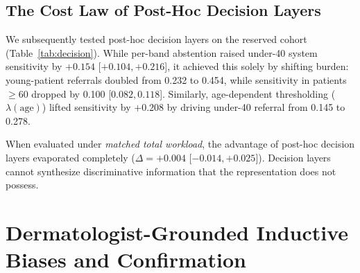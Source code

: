 \documentclass[journal]{IEEEtran}
\newcommand{\uforty}{under-40}
\begin{document}
\subsection{The Cost Law of Post-Hoc Decision Layers}
We subsequently tested post-hoc decision layers on the reserved cohort (Table~\ref{tab:decision}). While per-band abstention raised \uforty{} system sensitivity by $+0.154$ [$+0.104, +0.216$], it achieved this solely by shifting burden: young-patient referrals doubled from 0.232 to 0.454, while sensitivity in patients $\ge$60 dropped by 0.100 [$0.082, 0.118$]. Similarly, age-dependent thresholding ($\lambda(\text{age})$) lifted sensitivity by $+0.208$ by driving \uforty{} referral from 0.145 to 0.278. 

When evaluated under \emph{matched total workload}, the advantage of post-hoc decision layers evaporated completely ($\Delta = +0.004$ [$-0.014, +0.025$]). Decision layers cannot synthesize discriminative information that the representation does not possess.

\begin{table}[t]
\caption{Decision Layers on Reserved Cohort: Sensitivity Gain and Workload.}
\label{tab:decision}
\centering
{}
\end{table}

\section{Dermatologist-Grounded Inductive Biases and Confirmation}\label{sec:v5_modules}
\end{document}
